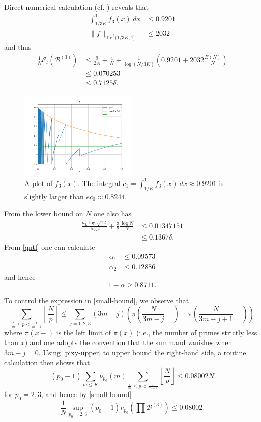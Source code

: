 \documentclass[12pt,a4paper,reqno]{amsart}
\numberwithin{equation}{section}
\theoremstyle{plain}
\theoremstyle{definition}
\newcommand\tuple{{\mathcal B}}
\newcommand\excess{{\mathcal{E}}}
\begin{document}
Direct numerical calculation (cf. ) reveals that
\begin{align*}
  \int_{1/3K}^1 f_3(x)\ dx &\leq 0.9201  \\
  \|f\|_{\mathrm{TV}^*(1/3K,1]} &\leq 2032
\end{align*}
and thus
\begin{align*}
  \frac{1}{N}\excess_t(\tuple^{(3)}) &\leq \frac{9}{2A} + \frac{4}{N} + \frac{1}{\log(N/3K)} \left(0.9201 + 2032 \frac{E(N)}{N}\right) \\
  &\leq 0.070253 \\
  &\leq 0.7125 \delta.
\end{align*}
\begin{figure}
  \centering
  \includegraphics[width=0.5\textwidth]{discrepancy.png}
  \caption{A plot of $f_3(x)$.  The integral $c_1 = \int_{1/K}^1 f_3(x)\ dx \approx 0.9201$ is slightly larger than $ec_0 \approx 0.8244$.}
  \label{fig-f}
  \end{figure}
From the lower bound on $N$ one also has
\begin{align*}
  \frac{\kappa_L \log \sqrt{12}}{\log t} + \frac{3}{2} \frac{\log N}{N} &\leq 0.01347151 \\
  &\leq 0.1367 \delta.
\end{align*}
From \eqref{qntl} one can calculate
\begin{align*}
  \alpha_1 &\leq 0.09573 \\
  \alpha_2 &\leq 0.12886
\end{align*}
and hence
$$ 1-\alpha \geq 0.8711.$$

To control the expression in \eqref{small-bound}, we observe that
\begin{equation}\label{tm}
   \sum_{\frac{t}{m} \leq p < \frac{t}{m-1}} \left\lfloor \frac{N}{p} \right\rfloor \leq \sum_{j=1,2,3} (3m-j) \left(\pi\left(\frac{N}{3m-j}-\right) - \pi\left(\frac{N}{3m-j+1}-\right)\right)
\end{equation}
where $\pi(x-)$ is the left limit of $\pi(x)$ (i.e., the number of primes strictly less than $x$) and one adopts the convention that the summand vanishes when $3m-j=0$.  Using \eqref{pixy-upper} to upper bound the right-hand side, a routine calculation then shows that
$$ (p_0-1) \sum_{m \leq K} \nu_{p_0}(m) \sum_{\frac{t}{m} \leq p < \frac{t}{m-1}} \left\lfloor \frac{N}{p} \right\rfloor \leq 0.08002N$$
for $p_0=2,3$,
and hence by \eqref{small-bound}
$$ \frac{1}{N} \sup_{p_0=2,3} (p_0-1) \nu_{p_0}\left( \prod \tuple^{(3)}\right) \leq 0.08002.$$
\end{document}
